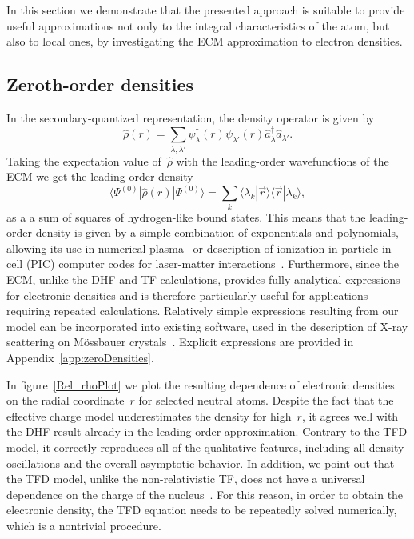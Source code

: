 In this section we demonstrate that the presented approach is suitable to provide useful approximations not only to the integral characteristics of the atom, but also to local ones, by investigating the ECM approximation to electron densities.

\subsection{Zeroth-order densities}

In the secondary-quantized representation, the density operator is given by
\begin{equation}
    \widehat{\rho}(r)=\sum_{\lambda,\lambda'}\psi_{\lambda}^\dag(r)\psi_{\lambda'}(r) \widehat{a}_{\lambda}^\dag \widehat{a}_{\lambda'}.
\end{equation}
Taking the expectation value of~$\widehat{\rho}$ with the leading-order wavefunctions of the ECM we get the leading order density
\begin{equation} \label{densityFormula}
    \langle\Psi^{(0)}|\widehat{\rho}(r)|\Psi^{(0)}\rangle = \sum_k \langle \lambda_k| \vec{r}\rangle \langle \vec{r}|\lambda_k \rangle,
\end{equation}
as a a sum of squares of hydrogen-like bound states. This means that the leading-order density is given by a simple combination of exponentials and polynomials,
allowing its use in numerical plasma~\cite{chung_flychk:_2005} or
description of ionization in particle-in-cell (PIC) computer codes
for laser-matter interactions~\cite{Arber_2015}. Furthermore, since the ECM, unlike the DHF and TF calculations, provides fully analytical expressions for electronic
densities and is therefore particularly useful for applications
requiring repeated calculations. Relatively simple expressions
resulting from our model can be incorporated into existing
software, used in the description of X-ray scattering on M\"{o}ssbauer
crystals~\cite{Sturhahn2000}. Explicit expressions are provided in Appendix~\ref{app:zeroDensities}.

In figure~\ref{Rel_rhoPlot} we plot the resulting
dependence of electronic densities on the radial coordinate~$r$ for
selected neutral atoms. Despite the fact that the effective charge
model underestimates the density for high~$r$, it agrees well with the
DHF result already in the leading-order
approximation. Contrary to the TFD model, it correctly
reproduces all of the qualitative features, including all density
oscillations and the overall asymptotic behavior. In addition, we
point out that the TFD model, unlike the
non-relativistic TF, does not have a
universal dependence on the charge of the nucleus~\cite{qua.560200311}. For this reason, in
order to obtain the electronic density, the TFD equation
needs to be repeatedly solved numerically, which is a nontrivial
procedure.

